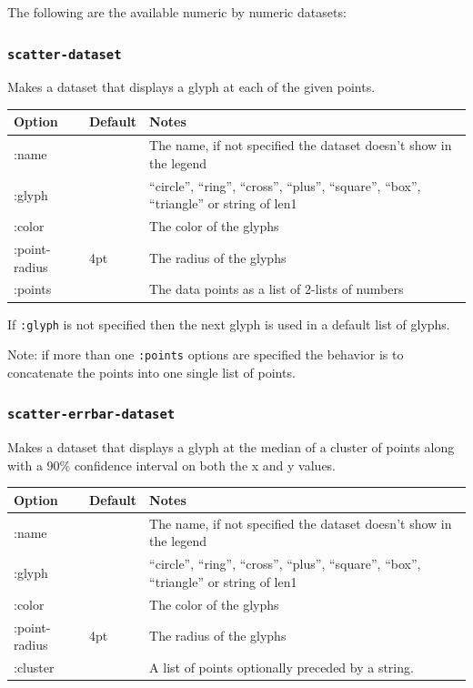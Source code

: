 \documentclass{article}
\begin{document}
The following are the available numeric by numeric datasets:

\subsubsection{\tt scatter-dataset}

Makes a dataset that displays a glyph at each of the given points.

\begin{center}
\begin{tabular}{lll}
Option & Default & Notes \\
\hline
:name & & The name, if not specified the dataset doesn't show in
the legend\\
:glyph & & ``circle'', ``ring'', ``cross'', ``plus'', ``square'',
``box'', ``triangle'' or string of len1\\
:color & & The color of the glyphs\\
:point-radius & 4pt & The radius of the glyphs\\
:points & & The data points as a list of 2-lists of numbers\\
\end{tabular}
\end{center}

If {\tt :glyph} is not specified then the next glyph is used in a
default list of glyphs.

Note: if more than one {\tt :points} options are specified the
behavior is to concatenate the points into one single list of points.

\subsubsection{\tt scatter-errbar-dataset}

Makes a dataset that displays a glyph at the median of a cluster of
points along with a 90\% confidence interval on both the x and y
values.

\begin{center}
\begin{tabular}{lll}
Option & Default & Notes \\
\hline
:name & & The name, if not specified the dataset doesn't show in
the legend\\
:glyph & & ``circle'', ``ring'', ``cross'', ``plus'', ``square'',
``box'', ``triangle'' or string of len1\\
:color & & The color of the glyphs\\
:point-radius & 4pt & The radius of the glyphs\\
:cluster & & A list of points optionally preceded by a string.
\end{tabular}
\end{center}
\end{document}
